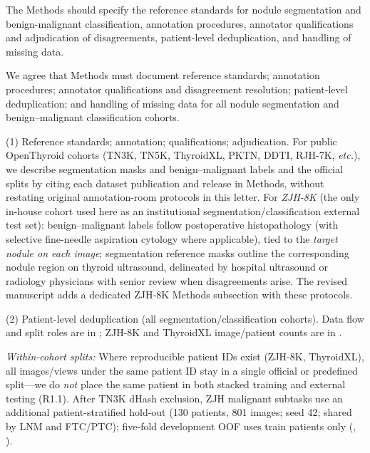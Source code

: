 \begin{reviewercomment}
The Methods should specify the reference standards for nodule segmentation and benign-malignant classification, annotation procedures, annotator qualifications and adjudication of disagreements, patient-level deduplication, and handling of missing data.
\end{reviewercomment}
\begin{authorresponse}
We agree that Methods must document reference standards; annotation procedures; annotator qualifications and disagreement resolution; patient-level deduplication; and handling of missing data for all nodule segmentation and benign--malignant classification cohorts.\par
(1) Reference standards; annotation; qualifications; adjudication. For public OpenThyroid cohorts (TN3K, TN5K, ThyroidXL, PKTN, DDTI, RJH-7K, \textit{etc.}), we describe segmentation masks and benign--malignant labels and the official splits by citing each dataset publication and release in Methods, without restating original annotation-room protocols in this letter. For \emph{ZJH-8K} (the only in-house cohort used here as an institutional segmentation/classification external test set): benign--malignant labels follow postoperative histopathology (with selective fine-needle aspiration cytology where applicable), tied to the \emph{target nodule on each image}; segmentation reference masks outline the corresponding nodule region on thyroid ultrasound, delineated by hospital ultrasound or radiology physicians with senior review when disagreements arise. The revised manuscript adds a dedicated ZJH-8K Methods subsection with these protocols.\par
(2) Patient-level deduplication (all segmentation/classification cohorts). Data flow and split roles are in ; ZJH-8K and ThyroidXL image/patient counts are in .\par
\textit{Within-cohort splits:} Where reproducible patient IDs exist (ZJH-8K, ThyroidXL), all images/views under the same patient ID stay in a single official or predefined split---we do \emph{not} place the same patient in both stacked training and external testing (R1.1). After TN3K dHash exclusion, ZJH malignant subtasks use an additional patient-stratified hold-out (130 patients, 801 images; seed 42; shared by LNM and FTC/PTC); five-fold development OOF uses train patients only (, ).\par

\end{authorresponse}
